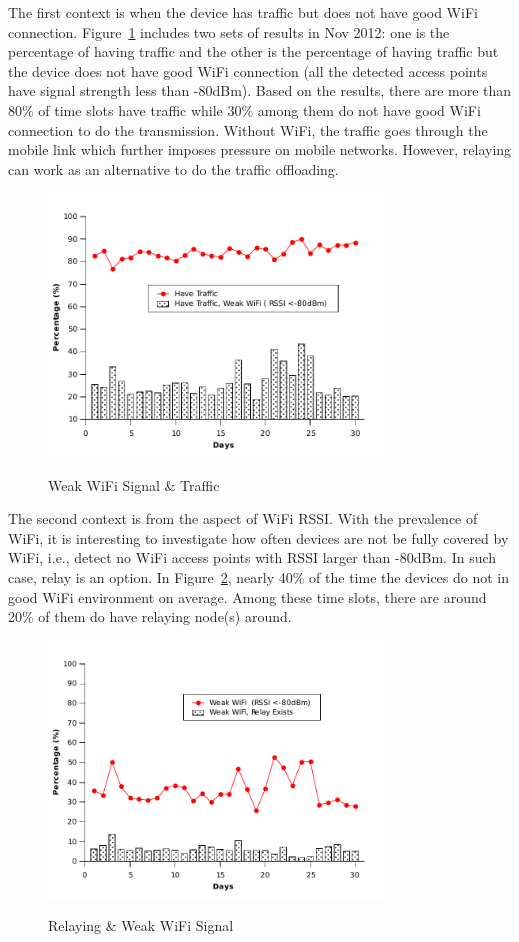 The first context is when the device has traffic but does not have good WiFi connection. Figure~\ref{fig:traffic_80} includes two sets of results in Nov 2012: one is the percentage of having traffic and the other is the percentage of having traffic but the device does not have good WiFi connection (all the detected access points have signal strength less than -80dBm). Based on the results, there are more than 80\% of time slots have traffic while 30\% among them do not have good WiFi connection to do the transmission. Without WiFi, the traffic goes through the mobile link which further imposes pressure on mobile networks. However, relaying can work as an alternative to do the traffic offloading. 

\begin{figure}[tbp]
\centering 
{\includegraphics[width=3.5in]{graphs/traffic_80.pdf}}
\caption{Weak WiFi Signal \& Traffic} 
\label{fig:traffic_80}
\end{figure}

The second context is from the aspect of WiFi RSSI. With the prevalence of WiFi, it is interesting to investigate how often devices are not be fully covered by WiFi, i.e., detect no WiFi access points with RSSI larger than -80dBm. In such case, relay is an option. In Figure~\ref{fig:80_relay}, nearly 40\% of the time the devices do not in good WiFi environment on average. Among these time slots, there are around 20\% of them do have relaying node(s) around. 

\begin{figure}[tbp]
\centering 
{\includegraphics[width=3.5in]{graphs/80_relay.pdf}}
\caption{Relaying \& Weak WiFi Signal} 
\label{fig:80_relay}
\end{figure}

